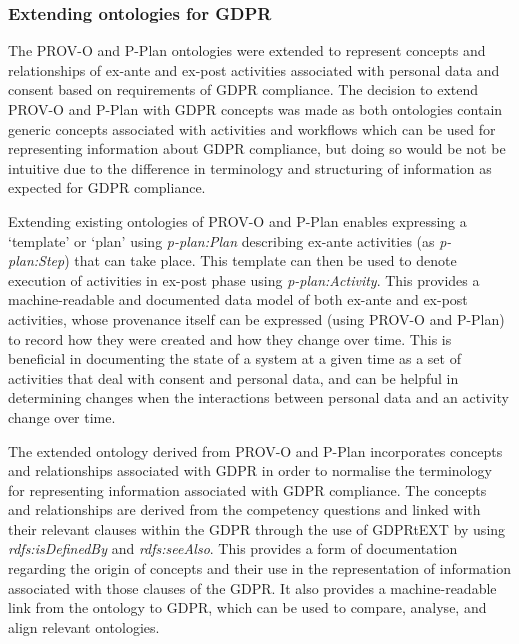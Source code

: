 \subsubsection{Extending ontologies for GDPR}
The PROV-O and P-Plan ontologies were extended to represent concepts and relationships of ex-ante and ex-post activities associated with personal data and consent based on requirements of GDPR compliance.
The decision to extend PROV-O and P-Plan with GDPR concepts was made as both ontologies contain generic concepts associated with activities and workflows which can be used for representing information about GDPR compliance, but doing so would be not be intuitive due to the difference in terminology and structuring of information as expected for GDPR compliance.

Extending existing ontologies of PROV-O and P-Plan enables expressing a `template'
or `plan' using \textit{p-plan:Plan} describing ex-ante activities (as \textit{p-plan:Step}) that can take place. This template can then be used to denote execution of activities in ex-post phase using \textit{p-plan:Activity}.
This provides a machine-readable and documented data model of both ex-ante and ex-post activities, whose provenance itself can be expressed (using PROV-O and P-Plan) to record how they were created and how they  change over time.
This is beneficial in documenting the state of a system at a given time as a set of activities that deal with consent and personal data, and
can be helpful in determining changes when the interactions between personal data and an activity change over time.

The extended ontology derived from PROV-O and P-Plan incorporates concepts and relationships associated with GDPR in order to normalise the terminology for representing information associated with GDPR compliance.
The concepts and relationships are derived from the competency questions and linked with their relevant clauses within the GDPR through the use of GDPRtEXT by using \textit{rdfs:isDefinedBy} and \textit{rdfs:seeAlso}.
This provides a form of documentation regarding the origin of concepts and their use in the representation of information associated with those clauses of the GDPR.
It also provides a machine-readable link from the ontology to GDPR, which can be used to compare, analyse, and align relevant ontologies.

